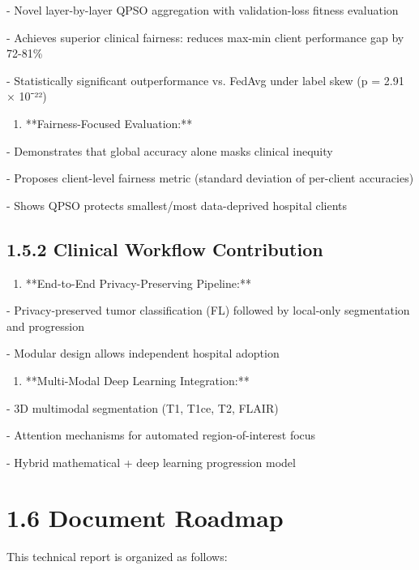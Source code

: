 - Novel layer-by-layer QPSO aggregation with validation-loss fitness evaluation

- Achieves superior clinical fairness: reduces max-min client performance gap by 72-81\%

- Statistically significant outperformance vs. FedAvg under label skew (p = 2.91 × 10⁻²²)

\begin{enumerate}
  \item **Fairness-Focused Evaluation:**
\end{enumerate}

- Demonstrates that global accuracy alone masks clinical inequity

- Proposes client-level fairness metric (standard deviation of per-client accuracies)

- Shows QPSO protects smallest/most data-deprived hospital clients


\subsection{1.5.2 Clinical Workflow Contribution}
\begin{enumerate}
  \item **End-to-End Privacy-Preserving Pipeline:**
\end{enumerate}

- Privacy-preserved tumor classification (FL) followed by local-only segmentation and progression

- Modular design allows independent hospital adoption

\begin{enumerate}
  \item **Multi-Modal Deep Learning Integration:**
\end{enumerate}

- 3D multimodal segmentation (T1, T1ce, T2, FLAIR)

- Attention mechanisms for automated region-of-interest focus

- Hybrid mathematical + deep learning progression model


\section{1.6 Document Roadmap}
This technical report is organized as follows:


